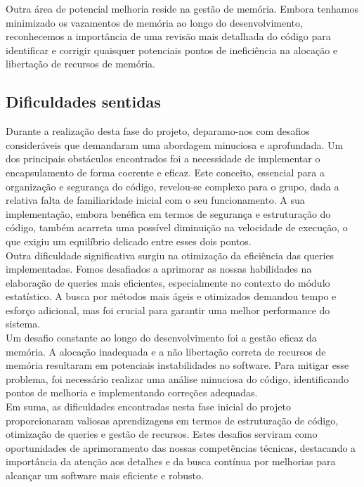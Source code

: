 \documentclass[12pt,a4paper]{article}
\begin{document}
    Outra área de potencial melhoria reside na gestão de memória. Embora tenhamos minimizado os vazamentos de memória ao longo do desenvolvimento, reconhecemos a importância de uma revisão mais detalhada do código para identificar e corrigir quaisquer potenciais pontos de ineficiência na alocação e libertação de recursos de memória.
        
    \subsection{Dificuldades sentidas}
      
    \hspace{0,6cm}Durante a realização desta fase do projeto, deparamo-nos com desafios consideráveis que demandaram uma abordagem minuciosa e aprofundada. Um dos principais obstáculos encontrados foi a necessidade de implementar o encapsulamento de forma coerente e eficaz. Este conceito, essencial para a organização e segurança do código, revelou-se complexo para o grupo, dada a relativa falta de familiaridade inicial com o seu funcionamento. A sua implementação, embora benéfica em termos de segurança e estruturação do código, também acarreta uma possível diminuição na velocidade de execução, o que exigiu um equilíbrio delicado entre esses dois pontos.\\

    Outra dificuldade significativa surgiu na otimização da eficiência das queries implementadas. Fomos desafiados a aprimorar as nossas habilidades na elaboração de queries mais eficientes, especialmente no contexto do módulo estatístico. A busca por métodos mais ágeis e otimizados demandou tempo e esforço adicional, mas foi crucial para garantir uma melhor performance do sistema.\\

    Um desafio constante ao longo do desenvolvimento foi a gestão eficaz da memória. A alocação inadequada e a não libertação correta de recursos de memória resultaram em potenciais instabilidades no software. Para mitigar esse problema, foi necessário realizar uma análise minuciosa do código, identificando pontos de melhoria e implementando correções adequadas.\\

    Em suma, as dificuldades encontradas nesta fase inicial do projeto proporcionaram valiosas aprendizagens em termos de estruturação de código, otimização de queries e gestão de recursos. Estes desafios serviram como oportunidades de aprimoramento das nossas competências técnicas, destacando a importância da atenção aos detalhes e da busca contínua por melhorias para alcançar um software mais eficiente e robusto.
    
\end{document}
